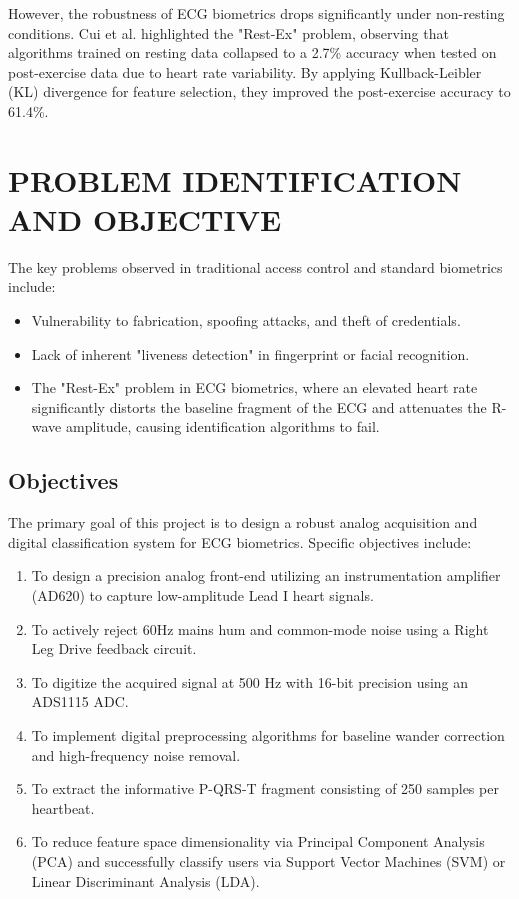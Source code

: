\documentclass[12pt,a4paper]{report}
\begin{document}
However, the robustness of ECG biometrics drops significantly under non-resting conditions. Cui et al. highlighted the "Rest-Ex" problem, observing that algorithms trained on resting data collapsed to a 2.7\% accuracy when tested on post-exercise data due to heart rate variability. By applying Kullback-Leibler (KL) divergence for feature selection, they improved the post-exercise accuracy to 61.4\%. 

\chapter{PROBLEM IDENTIFICATION AND OBJECTIVE}
The key problems observed in traditional access control and standard biometrics include:
\begin{itemize}
    \item Vulnerability to fabrication, spoofing attacks, and theft of credentials.
    \item Lack of inherent "liveness detection" in fingerprint or facial recognition.
    \item The "Rest-Ex" problem in ECG biometrics, where an elevated heart rate significantly distorts the baseline fragment of the ECG and attenuates the R-wave amplitude, causing identification algorithms to fail.
\end{itemize}

\section{Objectives}
The primary goal of this project is to design a robust analog acquisition and digital classification system for ECG biometrics. Specific objectives include:
\begin{enumerate}
    \item To design a precision analog front-end utilizing an instrumentation amplifier (AD620) to capture low-amplitude Lead I heart signals.
    \item To actively reject 60Hz mains hum and common-mode noise using a Right Leg Drive feedback circuit.
    \item To digitize the acquired signal at 500 Hz with 16-bit precision using an ADS1115 ADC.
    \item To implement digital preprocessing algorithms for baseline wander correction and high-frequency noise removal.
    \item To extract the informative P-QRS-T fragment consisting of 250 samples per heartbeat.
    \item To reduce feature space dimensionality via Principal Component Analysis (PCA) and successfully classify users via Support Vector Machines (SVM) or Linear Discriminant Analysis (LDA).
\end{enumerate}
\end{document}
